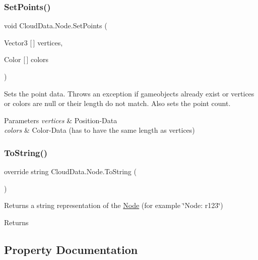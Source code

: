 \subsubsection{\texorpdfstring{Set\+Points()}{SetPoints()}}
{\footnotesize\ttfamily void Cloud\+Data.\+Node.\+Set\+Points (\begin{DoxyParamCaption}\item[{Vector3 \mbox{[}$\,$\mbox{]}}]{vertices,  }\item[{Color \mbox{[}$\,$\mbox{]}}]{colors }\end{DoxyParamCaption})\hspace{0.3cm}{\ttfamily [inline]}}



Sets the point data. Throws an exception if gameobjects already exist or vertices or colors are null or their length do not match. Also sets the point count. 


\begin{DoxyParams}{Parameters}
{\em vertices} & Position-\/\+Data\\
\hline
{\em colors} & Color-\/\+Data (has to have the same length as vertices)\\
\hline
\end{DoxyParams}
\mbox{\label{class_cloud_data_1_1_node_af070c6770edc822d95393383c70aa055}} 
\subsubsection{\texorpdfstring{To\+String()}{ToString()}}
{\footnotesize\ttfamily override string Cloud\+Data.\+Node.\+To\+String (\begin{DoxyParamCaption}{ }\end{DoxyParamCaption})\hspace{0.3cm}{\ttfamily [inline]}}



Returns a string representation of the \hyperlink{class_cloud_data_1_1_node}{Node} (for example \char`\"{}\+Node\+: r123\char`\"{}) 

\begin{DoxyReturn}{Returns}

\end{DoxyReturn}


\subsection{Property Documentation}
\mbox{\label{class_cloud_data_1_1_node_ad82330bd7fb62f8c25512d2f3ecd7888}} 
